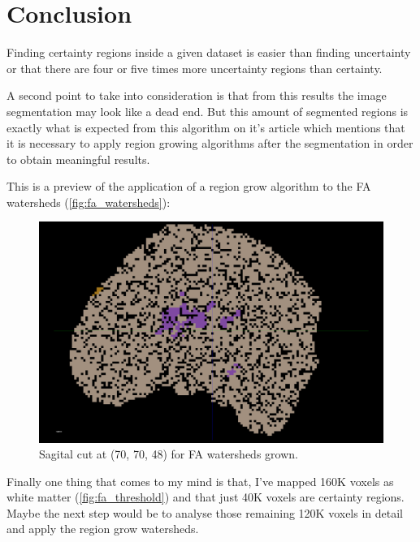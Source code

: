 \documentclass[a4paper,11pt]{report}
\begin{document}
\chapter{Conclusion}
Finding certainty regions inside a given dataset is easier than finding uncertainty or that there are four or five times more uncertainty regions than certainty.

A second point to take into consideration is that from this results the image segmentation may look like a dead end. But this amount of segmented regions is exactly what is expected from this algorithm on it's article which mentions that it is necessary to apply region growing algorithms after the segmentation in order to obtain meaningful results.

This is a preview of the application of a region grow algorithm to the FA watersheds (\ref{fig:fa_watersheds}):

\begin{figure}[H]
  \includegraphics[width=1\linewidth]{imgs/fa_watersheds_01_20_grown.png}
  \caption{Sagital cut at (70, 70, 48) for FA watersheds grown.}
  \label{fig:fa_watersheds_grown}
\end{figure}

Finally one thing that comes to my mind is that, I've mapped 160K voxels as white matter (\ref{fig:fa_threshold}) and that just 40K voxels are certainty regions. Maybe the next step would be to analyse those remaining 120K voxels in detail and apply the region grow watersheds.
\end{document}
